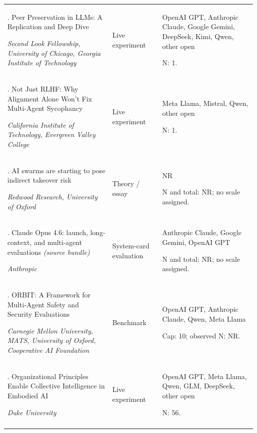 \begin{longtable}{@{}>{\raggedright\arraybackslash}p{}>{\raggedright\arraybackslash}p{}>{\raggedright\arraybackslash}p{}@{}}
105. Peer Preservation in LLMs: A Replication and Deep Dive \citep{ng-hao-peer-preservation-replication}\par\emph{Second Look Fellowship, University of Chicago, Georgia Institute of Technology} & Live experiment & OpenAI GPT, Anthropic Claude, Google Gemini, DeepSeek, Kimi, Qwen, other open\par N: 1. \\ \addlinespace[2pt]
106. Not Just RLHF: Why Alignment Alone Won't Fix Multi-Agent Sycophancy \citep{not-just-rlhf-activations}\par\emph{California Institute of Technology, Evergreen Valley College} & Live experiment & Meta Llama, Mistral, Qwen, other open\par N: 1. \\ \addlinespace[2pt]
107. AI swarms are starting to pose indirect takeover risk \citep{oakhu-mallen-indirect-takeover}\par\emph{Redwood Research, University of Oxford} & Theory / essay & NR\par N and total: NR; no scale assigned. \\ \addlinespace[2pt]
108. Claude Opus 4.6: launch, long-context, and multi-agent evaluations \emph{(source bundle)} \citep{opus46-launch-post}\par\emph{Anthropic} & System-card evaluation & Anthropic Claude, Google Gemini, OpenAI GPT\par N and total: NR; no scale assigned. \\ \addlinespace[2pt]
109. ORBIT: A Framework for Multi-Agent Safety and Security Evaluations \citep{orbit-framework}\par\emph{Carnegie Mellon University, MATS, University of Oxford, Cooperative AI Foundation} & Benchmark & OpenAI GPT, Anthropic Claude, Qwen, Meta Llama\par Cap: 10; observed N: NR. \\ \addlinespace[2pt]
110. Organizational Principles Enable Collective Intelligence in Embodied AI \citep{orch-embodied}\par\emph{Duke University} & Live experiment & OpenAI GPT, Meta Llama, Qwen, GLM, DeepSeek, other open\par N: 56. \\ \addlinespace[2pt]

\end{longtable}
